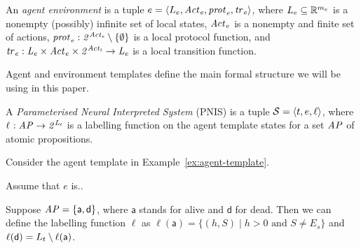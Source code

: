 \begin{definition}
An {\em agent environment} is a tuple ${e} = \left \langle L_{e}, \it{Act}_{e}, \it{prot}_{e}, \it{tr}_{e}  \right \rangle$, where $L_{e}  \subseteq \mathbb R^{m_e}$ is a nonempty
(possibly) infinite set of local states, $\it{Act}_{e}$ is a nonempty and finite set
of actions,  $\it{prot}_{e} : 2^{\it{Act}_{e}} \setminus \left \{ \emptyset \right \}$ is a local
protocol function, and $\it{tr}_{e} : L_{e} \times \it{Act}_{e} \times 2^{\it{Act}_{t}} 
\rightarrow L_{e}$ is a local transition function.
\end{definition}


Agent and environment templates define the main formal structure we will be
using in this paper.

\begin{definition}
  A {\em Parameterised Neural Interpreted System} (PNIS) is a tuple $\mathcal S
  = \left \langle {t}, {e}, \ell \right \rangle$, where $\ell_{} : \it{AP} \rightarrow
  2^{L_{t}}$ is a labelling function on the agent  template states for a set
  $\it{AP}$ of atomic propositions.
\end{definition}

\begin{example}
  \label{ex:pnis}
  Consider the agent template in Example~\ref{ex:agent-template}.

  Assume that $e$ is.. %
  
  Suppose $\it{AP} = \{\mathsf{a}, \mathsf{d}\}$, where $\mathsf{a}$ stands for
  alive and $\mathsf{d}$ for dead. Then we can define the labelling function
  $\ell$ as $\ell(\mathsf{a}) = \{(h,S) \mid h > 0 \text{ and }S \neq E_s\}$
  and $\ell(\mathsf{d}) = L_{t} \setminus \ell(\mathsf{a})$.
\end{example}

